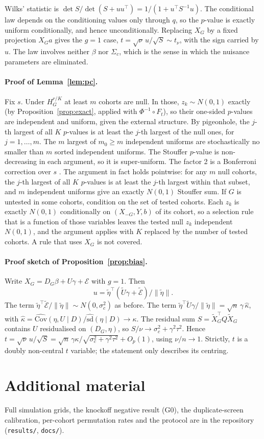 \documentclass[10pt,twocolumn,letterpaper]{article}
\theoremstyle{remark}
\begin{document}
Wilks' statistic is $\det S/\det(S+uu^\top)=1/(1+u^\top S^{-1}u)$. The conditional law depends on the conditioning values only through $q$, so the $p$-value is exactly uniform conditionally, and hence unconditionally. Replacing $X_G$ by a fixed projection $X_Ga$ gives the $g=1$ case, $t=\sqrt\nu\,u/\sqrt S\sim t_\nu$, with the sign carried by $u$. The law involves neither $\beta$ nor $\Sigma_c$, which is the sense in which the nuisance parameters are eliminated.

\paragraph{Proof of Lemma~\ref{lem:pc}.} Fix $s$. Under $H^{r/K}_G$ at least $m$ cohorts are null. In those, $z_k\sim N(0,1)$ exactly (by Proposition~\ref{prop:exact}, applied with $\Phi^{-1}\circ F_t$), so their one-sided $p$-values are independent and uniform, given the external structure. By pigeonhole, the $j$-th largest of all $K$ $p$-values is at least the $j$-th largest of the null ones, for $j=1,\dots,m$. The $m$ largest of $m_0\ge m$ independent uniforms are stochastically no smaller than $m$ sorted independent uniforms. The Stouffer $p$-value is non-decreasing in each argument, so it is super-uniform. The factor 2 is a Bonferroni correction over $s$ \citep{benjamini2008pc}. The argument in fact holds pointwise: for any $m$ null cohorts, the $j$-th largest of all $K$ $p$-values is at least the $j$-th largest within that subset, and $m$ independent uniforms give an exactly $N(0,1)$ Stouffer sum. If $G$ is untested in some cohorts, condition on the set of tested cohorts. Each $z_k$ is exactly $N(0,1)$ conditionally on $(X_{-G},Y,b)$ of its cohort, so a selection rule that is a function of those variables leaves the tested null $z_k$ independent $N(0,1)$, and the argument applies with $K$ replaced by the number of tested cohorts. A rule that uses $X_G$ is not covered.

\paragraph{Proof sketch of Proposition~\ref{prop:bias}.} Write $X_G=D_G\beta+U\gamma+\mathcal E$ with $g=1$. Then
\[
u=\tilde\eta^\top(\tilde U\gamma+\tilde{\mathcal E})/\|\tilde\eta\| .
\]
The term $\tilde\eta^\top\tilde{\mathcal E}/\|\tilde\eta\|\sim N(0,\sigma_c^2)$ as before. The term $\tilde\eta^\top\tilde U\gamma/\|\tilde\eta\|=\sqrt n\,\gamma\,\hat\kappa$, with $\hat\kappa=\widehat{\mathrm{Cov}}(\eta,U\mid D)/\widehat{\mathrm{sd}}(\eta\mid D)\to\kappa$. The residual sum $S=\tilde X_G^\top Q\tilde X_G$ contains $U$ residualised on $(D_G,\eta)$, so $S/\nu\to\sigma_c^2+\gamma^2\tau^2$. Hence $t=\sqrt\nu\,u/\sqrt S=\sqrt n\,\gamma\kappa/\sqrt{\sigma_c^2+\gamma^2\tau^2}+O_p(1)$, using $\nu/n\to1$. Strictly, $t$ is a doubly non-central $t$ variable; the statement only describes its centring.

\section{Additional material}
Full simulation grids, the knockoff negative result (G0), the duplicate-screen calibration, per-cohort permutation rates and the protocol are in the repository (\texttt{results/}, \texttt{docs/}).
\end{document}
